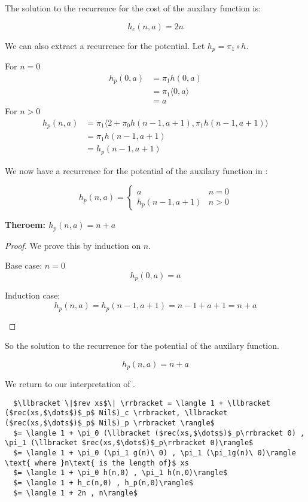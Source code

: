 The solution to the recurrence for the cost of the auxilary function  is:
\begin{framed}
  \[h_c(n,a) = 2n \]
\end{framed}


We can also extract a recurrence for the potential. Let $h_p = \pi_1 \circ h$.

For $n=0$
\begin{align*}
h_p(0,a) &= \pi_1 h(0,a)\\
&= \pi_1 \langle 0, a\rangle\\
&= a
\end{align*}
For $n>0$
\begin{align*}
h_p(n,a) &= \pi_1 \langle 2 + \pi_0 h(n-1,a+1), \pi_1 h(n-1,a+1)\rangle\\
&= \pi_1 h(n-1,a+1)\\
&= h_p (n-1,a+1)
\end{align*}

We now have a recurrence for the potential of the auxilary function in :
\begin{framed}
  \begin{equation}
    h_p(n,a) = \begin{cases}
      a & n = 0 \\
      h_p(n-1,a+1) & n > 0
    \end{cases}
  \end{equation}
\end{framed}

\textbf{Theroem: $h_p(n,a) = n + a$}
\begin{proof}
  We prove this by induction on $n$.
  \begin{description}
    \item{Base case: $n=0$}\hfill \\
      \[ h_p(0,a) = a \]
    \item{Induction case:}\hfill \\
      \[h_p(n,a) = h_p(n-1,a+1) = n - 1 + a + 1 = n + a\]
  \end{description}
\end{proof}  

So the solution to the recurrence for the potential of the auxilary function.
\begin{framed}
  \[h_p(n,a) = n + a \]
\end{framed}


We return to our interpretation of .
\begin{lstlisting}
  $\llbracket \|$rev xs$\| \rrbracket = \langle 1 + \llbracket ($rec(xs,$\dots$)$_p$ Nil$)_c \rrbracket, \llbracket ($rec(xs,$\dots$)$_p$ Nil$)_p \rrbracket \rangle$
  $= \langle 1 + \pi_0 (\llbracket ($rec(xs,$\dots$)$_p\rrbracket 0) , \pi_1 (\llbracket $rec(xs,$\dots$)$_p\rrbracket 0)\rangle$
  $= \langle 1 + \pi_0 (\pi_1 g(n)\ 0) , \pi_1 (\pi_1g(n)\ 0)\rangle \text{ where }n\text{ is the length of}$ xs
  $= \langle 1 + \pi_0 h(n,0) , \pi_1 h(n,0)\rangle$
  $= \langle 1 + h_c(n,0) , h_p(n,0)\rangle$
  $= \langle 1 + 2n , n\rangle$
\end{lstlisting}

